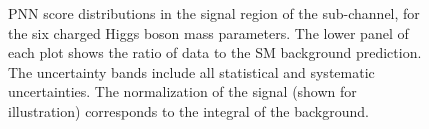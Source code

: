 \begin{figure}
		\caption{\label{fig:taulepPNNscoreSR2_body} PNN score distributions in the
		signal region of the \taumu sub-channel, for the six charged Higgs boson mass parameters.
		The lower panel of each plot shows the ratio of data to the \acrshort{SM} background prediction. The uncertainty bands include all statistical and systematic uncertainties.
		The normalization of the signal (shown for illustration) corresponds to the integral of the background.}
		\end{figure}

